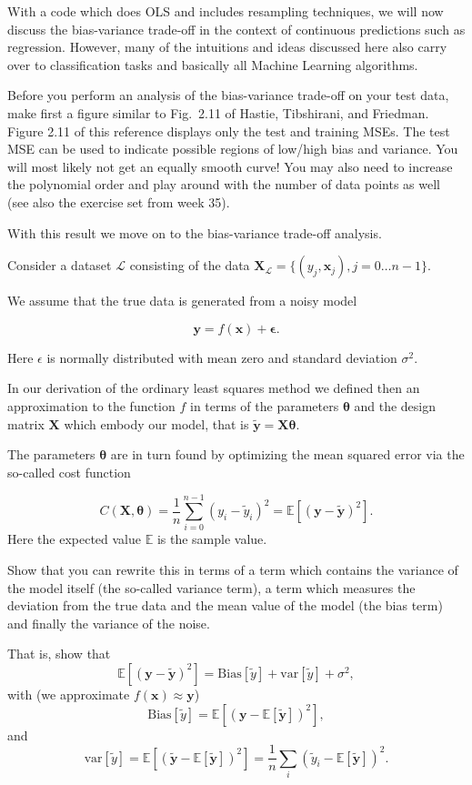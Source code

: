 \documentclass[%
oneside,                 %
final,                   %
10pt]{article}
\begin{document}
With a code which does OLS and includes resampling techniques, 
we will now discuss the bias-variance trade-off in the context of
continuous predictions such as regression. However, many of the
intuitions and ideas discussed here also carry over to classification
tasks and basically all Machine Learning algorithms. 

Before you perform an analysis of the bias-variance trade-off on your
test data, make first a figure similar to Fig.~2.11 of Hastie,
Tibshirani, and Friedman. Figure 2.11 of this reference displays only
the test and training MSEs. The test MSE can be used to indicate
possible regions of low/high bias and variance. You will most likely
not get an equally smooth curve! You may also need to increase the
polynomial order and play around with the number of data points as
well (see also the exercise set from week 35).

With this result we move on to the bias-variance trade-off analysis.

Consider a
dataset $\mathcal{L}$ consisting of the data
$\mathbf{X}_\mathcal{L}=\{(y_j, \boldsymbol{x}_j), j=0\ldots n-1\}$.

We assume that the true data is generated from a noisy model

\[
\bm{y}=f(\boldsymbol{x}) + \bm{\epsilon}.
\]

Here $\epsilon$ is normally distributed with mean zero and standard
deviation $\sigma^2$.

In our derivation of the ordinary least squares method we defined then
an approximation to the function $f$ in terms of the parameters
$\bm{\theta}$ and the design matrix $\bm{X}$ which embody our model,
that is $\bm{\tilde{y}}=\bm{X}\bm{\theta}$.

The parameters $\bm{\theta}$ are in turn found by optimizing the mean
squared error via the so-called cost function

\[
C(\bm{X},\bm{\theta}) =\frac{1}{n}\sum_{i=0}^{n-1}(y_i-\tilde{y}_i)^2=\mathbb{E}\left[(\bm{y}-\bm{\tilde{y}})^2\right].
\]
Here the expected value $\mathbb{E}$ is the sample value. 

Show that you can rewrite this in terms of a term which contains the
variance of the model itself (the so-called variance term), a term
which measures the deviation from the true data and the mean value of
the model (the bias term) and finally the variance of the noise.

That is, show that
\[
\mathbb{E}\left[(\bm{y}-\bm{\tilde{y}})^2\right]=\mathrm{Bias}[\tilde{y}]+\mathrm{var}[\tilde{y}]+\sigma^2, 
\]
with (we approximate $f(\bm{x})\approx \bm{y}$) 
\[
\mathrm{Bias}[\tilde{y}]=\mathbb{E}\left[\left(\bm{y}-\mathbb{E}\left[\bm{\tilde{y}}\right]\right)^2\right],
\]
and 
\[
\mathrm{var}[\tilde{y}]=\mathbb{E}\left[\left(\tilde{\bm{y}}-\mathbb{E}\left[\bm{\tilde{y}}\right]\right)^2\right]=\frac{1}{n}\sum_i(\tilde{y}_i-\mathbb{E}\left[\bm{\tilde{y}}\right])^2.
\]
\end{document}
